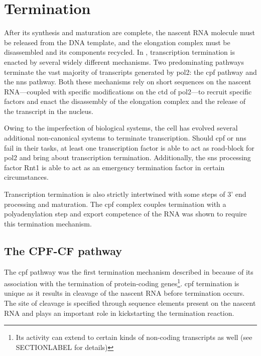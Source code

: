 \section{Termination} %
After its synthesis and maturation are complete, the nascent RNA molecule must be released from the DNA template, and the elongation complex must be disassembled and its components recycled.
In \cer{}, transcription termination is enacted by several widely different mechanisms.
Two predominating pathways terminate the vast majority of transcripts generated by \acrlong{pol2}: the \gls{cpf} pathway and the \gls{nns}  pathway. 
Both these mechanisms rely on short sequences on the nascent RNA---coupled with specific modifications on the \gls{ctd} of \gls{pol2}---to recruit specific factors and enact the disassembly of the elongation complex and the release of the transcript in the nucleus.

Owing to the imperfection of biological systems, the cell has evolved several additional non-canonical systems to terminate transcription. Should \gls{cpf} or \gls{nns} fail in their tasks, at least one transcription factor is able to act as road-block for \gls{pol2} and bring about transcription termination. Additionally, the \gls{sns} processing factor Rnt1 is able to act as an emergency termination factor in certain circumstances. 

Transcription termination is also strictly intertwined with some steps of 3' end processing and maturation. 
The \gls{cpf} complex couples termination with a polyadenylation step and export competence of the RNA was shown to require this termination mechanism.  




\subsection{The CPF-CF pathway}
The \gls{cpf} pathway was the first termination mechanism described in \cer{} because of its association with the termination of protein-coding genes\footnote{Its activity can extend to certain kinds of non-coding transcripts as well (see SECTIONLABEL for details)}. 
\gls{cpf} termination is unique as it results in cleavage of the nascent RNA before termination occurs.
The site of cleavage is specified through sequence elements present on the nascent RNA and plays an important role in kickstarting the termination reaction.

